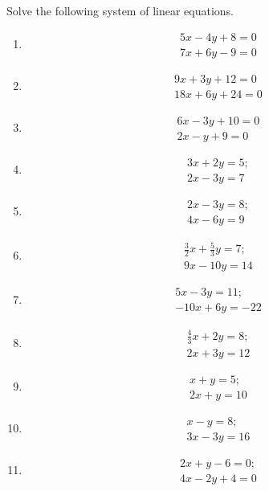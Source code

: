  Solve the following system of linear equations.
\begin{enumerate}[label=\thesubsection.\arabic*,ref=\thesubsection.\theenumi]
\item \begin{align}
	5x-4y+8=0\\ 
      	7x+6y-9=0
	\end{align}
\item \begin{align}
	9x+3y+12=0\\
	18x+6y+24=0
	\end{align}
\item \begin{align}
        6x-3y+10=0\\
	2x-y+9=0
	\end{align}
	\item \begin{align}
       		3x+2y=5; \\
      		2x-3y=7
    	       \end{align} 
	\item \begin{align}
		2x-3y=8;\\
		4x-6y=9
		\end{align}
	\item \begin{align}
		\frac{3}{2}x+\frac{5}{3}y=7;\\
		9x-10y=14
		\end{align}
\item \begin{align}
		5x-3y=11;\\
		-10x+6y=-22
	\end{align}
\item \begin{align}
         \frac{4}{3}x+2y=8;\\
	  2x+3y=12
	\end{align}
\item \begin{align}
	x+y=5;\\
	2x+y=10
	\end{align}
\item \begin{align}
	x-y=8;\\
	3x-3y=16
	\end{align}
\item \begin{align}
 	2x+y-6=0;\\
 	4x-2y+4=0
	\end{align}

\end{enumerate}
